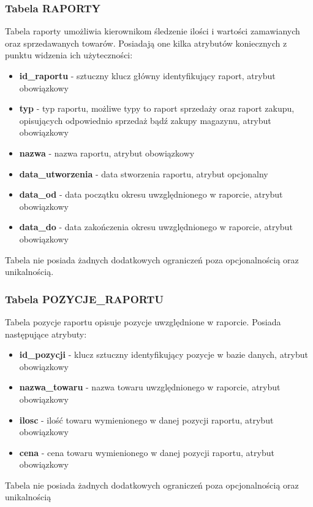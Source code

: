 \subsubsection{Tabela RAPORTY}
Tabela raporty umożliwia kierownikom śledzenie ilości i wartości zamawianych
oraz sprzedawanych towarów. Posiadają one kilka atrybutów koniecznych z punktu
widzenia ich użyteczności:
\begin{itemize}
  \item \textbf{id\_raportu} - sztuczny klucz główny identyfikujący raport,
  atrybut obowiązkowy
  \item \textbf{typ} - typ raportu, możliwe typy to raport sprzedaży oraz raport
  zakupu, opisujących odpowiednio sprzedaż bądź zakupy magazynu, atrybut
  obowiązkowy
  \item \textbf{nazwa} - nazwa raportu, atrybut obowiązkowy
  \item \textbf{data\_utworzenia} - data stworzenia raportu, atrybut opcjonalny
  \item \textbf{data\_od} - data początku okresu uwzględnionego w raporcie,
  atrybut obowiązkowy
  \item \textbf{data\_do} - data zakończenia okresu uwzględnionego w raporcie,
  atrybut obowiązkowy
\end{itemize}

Tabela nie posiada żadnych dodatkowych ograniczeń poza opcjonalnością oraz
unikalnością.

\subsubsection{Tabela POZYCJE\_RAPORTU}
Tabela pozycje raportu opisuje pozycje uwzględnione w raporcie. Posiada
następujące atrybuty:
\begin{itemize}
  \item \textbf{id\_pozycji} - klucz sztuczny identyfikujący pozycje w bazie
  danych, atrybut obowiązkowy
  \item \textbf{nazwa\_towaru} - nazwa towaru uwzględnionego w raporcie, atrybut
  obowiązkowy
  \item \textbf{ilosc} - ilość towaru wymienionego w danej pozycji raportu,
  atrybut obowiązkowy
  \item \textbf{cena} - cena towaru wymienionego w danej pozycji raportu,
  atrybut obowiązkowy
\end{itemize}

Tabela nie posiada żadnych dodatkowych ograniczeń poza opcjonalnością oraz
unikalnością
